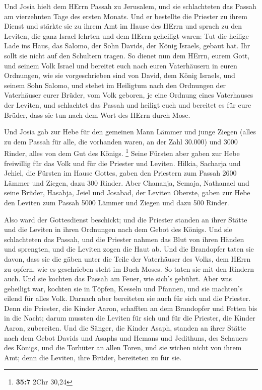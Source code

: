  Und Josia hielt dem HErrn Passah zu Jerusalem, und sie
schlachteten das Passah am vierzehnten Tage des ersten Monats.
 Und er bestellte die Priester zu ihrem Dienst und stärkte
sie zu ihrem Amt im Hause des HErrn  und sprach zu den
Leviten, die ganz Israel lehrten und dem HErrn geheiligt waren: Tut die
heilige Lade ins Haus, das Salomo, der Sohn Davids, der König Israels,
gebaut hat. Ihr sollt sie nicht auf den Schultern tragen. So dienet nun
dem HErrn, eurem Gott, und seinem Volk Israel  und
bereitet euch nach euren Vaterhäusern in euren Ordnungen, wie sie
vorgeschrieben sind von David, dem König Israels, und seinem Sohn
Salomo,  und stehet im Heiligtum nach den Ordnungen der
Vaterhäuser eurer Brüder, vom Volk geboren, je eine Ordnung eines
Vaterhauses der Leviten,  und schlachtet das Passah und
heiligt euch und bereitet es für eure Brüder, dass sie tun nach dem Wort
des HErrn durch Mose.

 Und Josia gab zur Hebe für den gemeinen Mann Lämmer und
junge Ziegen (alles zu dem Passah für alle, die vorhanden waren, an der
Zahl 30.000) und 3000 Rinder, alles von dem Gut des Königs. \footnote{\textbf{35:7}
  2Chr 30,24}  Seine Fürsten aber gaben zur Hebe
freiwillig für das Volk und für die Priester und Leviten. Hilkia,
Sacharja und Jehiel, die Fürsten im Hause Gottes, gaben den Priestern
zum Passah 2600 Lämmer und Ziegen, dazu 300 Rinder.  Aber
Chananja, Semaja, Nathanael und seine Brüder, Hasabja, Jeiel und
Josabad, der Leviten Oberste, gaben zur Hebe den Leviten zum Passah 5000
Lämmer und Ziegen und dazu 500 Rinder.

 Also ward der Gottesdienst beschickt; und die Priester
standen an ihrer Stätte und die Leviten in ihren Ordnungen nach dem
Gebot des Königs.  Und sie schlachteten das Passah, und
die Priester nahmen das Blut von ihren Händen und sprengten, und die
Leviten zogen die Haut ab.  Und die Brandopfer taten sie
davon, dass sie die gäben unter die Teile der Vaterhäuser des Volks, dem
HErrn zu opfern, wie es geschrieben steht im Buch Moses. So taten sie
mit den Rindern auch.  Und sie kochten das Passah am
Feuer, wie sich's gebührt. Aber was geheiligt war, kochten sie in
Töpfen, Kesseln und Pfannen, und sie machten's eilend für alles Volk.
 Darnach aber bereiteten sie auch für sich und die
Priester. Denn die Priester, die Kinder Aaron, schafften an dem
Brandopfer und Fetten bis in die Nacht; darum mussten die Leviten für
sich und für die Priester, die Kinder Aaron, zubereiten. 
Und die Sänger, die Kinder Asaph, standen an ihrer Stätte nach dem Gebot
Davids und Asaphs und Hemans und Jedithuns, des Schauers des Königs, und
die Torhüter an allen Toren, und sie wichen nicht von ihrem Amt; denn
die Leviten, ihre Brüder, bereiteten zu für sie.


